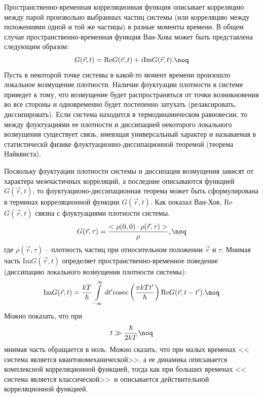 Пространственно-временная корреляционная функция описывает
корреляцию между парой произвольно выбранных частиц системы (или
корреляцию между положениями одной и той же частицы) в разные
моменты времени.
В общем случае пространственно-временная функция Ван-Хова может
быть представлена следующим образом:
$$G(\vec r,t)=\hbox{Re}G(\vec r,t)+i\hbox{Im}G(\vec r,t).\noq$$
Пусть в некоторой точке системы в какой-то момент времени
произошло локальное возмущение плотности. Наличие флуктуации
плотности в системе приведет к тому, что возмущение будет
распространяться от точки возникновения во все стороны и
одновременно будет постепенно затухать (релаксировать,
диссипировать).
Если система находится в термодинамическом равновесии, то между
флуктуациями ее плотности и диссипацией некоторого локального
возмущения существует связь, имеющая универсальный характер и
называемая в статистическй физике флуктуационно-диссипационной
теоремой (теорема Найквиста).

Поскольку флуктуации плотности системы и диссипация возмущения
зависят от характера межчастичных корреляций, а последние
описываются функцией $G(\vec r,t)$, то
флуктуационо-диссипационная теорема может быть сформулирована в
терминах корреляционной функции $G(\vec r,t)$.
Как показал Ван-Хов, Re$G(\vec r,t)$ связна с флуктуациями
плотности системы.
$$G(\vec r,\tau)={<\rho(0,0)\cdot\rho(\vec
r,\tau)>\over\rho},\noq$$
где $\rho(\vec r,\tau)$ -- плотность частиц при относительном
положении $\vec r$ и $\tau$.
Мнимая часть Im$G(\vec r,t)$ определяет пространственно-временное
поведение (диссипацию локального возмущения плотности системы):
$$\hbox{Im}G(\vec
r,t)={kT\over\hbar}\int\limits_{-\infty}^{\infty}dt'
\hbox{cosec}\left({\pi kTt'\over\hbar}\right)\hbox{Re}G(\vec
r,t-t').\noq$$
Можно показать, что при $$t\gg{\hbar\over2kT}\noq$$ мнимая часть
 обращается в ноль.
Можно сказать, что при малых временах << система является
квантовомеханической>>, а ее динамика описывается комплексной
корреляционной функцией, тогда как при больших временах <<
система является классической>>\ и описывается действительной
корреляционной функцией.

